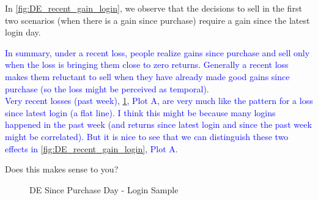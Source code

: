 In \ref{fig:DE_recent_gain_login}, we observe that the decisions to sell in the first two scenarios (when there is a gain since purchase) require a gain since the latest login day.

\textcolor{blue}{In summary, under a recent loss, people realize gains since purchase and sell only when the loss is bringing them close to zero returns. Generally a recent loss makes them reluctant to sell when they have already made good gains since purchase (so the loss might be perceived as temporal). \\
Very recent losses (past week), \ref{fig:DE_recent_gain}, Plot A, are very much like the pattern for a loss since latest login (a flat line). I think this might be because many logins happened in the past week (and returns since latest login and since the past week might be correlated). But it is nice to see that we can distinguish these two effects in \ref{fig:DE_recent_gain_login}, Plot A.}

Does this makes sense to you?

\begin{figure}%
	\centering%
	\caption{ DE Since Purchase Day - Login Sample }%
	\label{fig:DE_recent_gain}%

	\fignote{  }
\end{figure}


